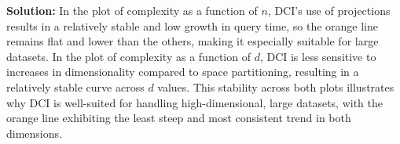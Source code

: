 \documentclass{article}
\newenvironment{solution}{\color{blue} \smallskip \textbf{Solution:}}{}
\begin{document}
\begin{enumerate}[(a)]
\begin{solution}
In the plot of complexity as a function of \(n\), DCI's use of projections results in a relatively stable and low growth in query time, so the orange line remains flat and lower than the others, making it especially suitable for large datasets. In the plot of complexity as a function of \(d\), DCI is less sensitive to increases in dimensionality compared to space partitioning, resulting in a relatively stable curve across \(d\) values. This stability across both plots illustrates why DCI is well-suited for handling high-dimensional, large datasets, with the orange line exhibiting the least steep and most consistent trend in both dimensions.




    \end{solution}
\end{enumerate}
\end{document}

